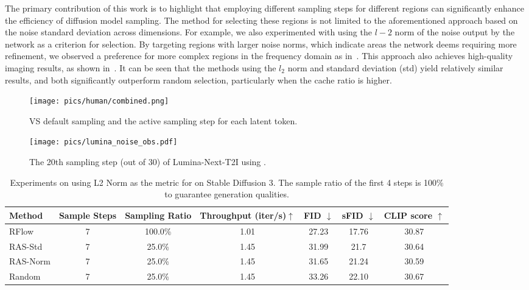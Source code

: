 The primary contribution of this work is to highlight that employing different sampling steps for different regions can significantly enhance the efficiency of diffusion model sampling. The method for selecting these regions is not limited to the aforementioned approach based on the noise standard deviation across dimensions. For example, we also experimented with using the $l-2$ norm of the noise output by the network as a criterion for selection. By targeting regions with larger noise norms, which indicate areas the network deems requiring more refinement, we observed a preference for more complex regions in the frequency domain as in~. This approach also achieves high-quality imaging results, as shown in~. It can be seen that the methods using the $l_2$ norm and standard deviation (std) yield relatively similar results, and both significantly outperform random selection, particularly when the cache ratio is higher.









\begin{figure*}[hb]
    \centering
    \texttt{[image: pics/human/combined.png]}
    \caption{\ourmethod{} VS default sampling and the active sampling step for each latent token.}
    \label{fig:app_vis}
\end{figure*}


\clearpage

\begin{figure*}[hb]
    \centering
    \texttt{[image: pics/lumina\_noise\_obs.pdf]}
    \caption{The 20th sampling step (out of 30) of Lumina-Next-T2I using \ourmethod{}.}
    \label{fig:noise_obs}
\end{figure*}

\begin{table*}[htbp]
\centering
\begin{tabular}{lcccccc}
\hline
Method & Sample Steps & Sampling Ratio & Throughput (iter/s)$\uparrow$ & FID $\downarrow$ & sFID $\downarrow$ & CLIP score $\uparrow$ \\
\hline
\rowcolor{gray!10}
RFlow & 7 & 100.0\% & 1.01 & 27.23 & 17.76 & 30.87 \\
\hline
RAS-Std & 7 & 25.0\% & 1.45 & 31.99 & 21.7 & 30.64 \\

RAS-Norm & 7 & 25.0\% & 1.45 & 31.65 & 21.24 & 30.59 \\

Random & 7 & 25.0\% & 1.45 & 33.26 & 22.10 &  30.67\\
\hline

\end{tabular}
\caption{Experiments on using L2 Norm as the metric for \ourmethod{} on Stable Diffusion 3. The sample ratio of the first 4 steps is 100\% to guarantee generation qualities.}
\label{tab:l2_norm}
\end{table*}

